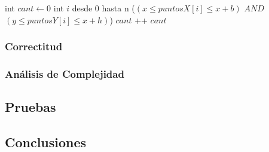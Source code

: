 \begin{algorithm}[H]
\caption{} 
\begin{codebox}
\li int $cant \gets 0$
\li \For int $i$ desde 0 hasta n \Do
\li 	\If ($(x \leq puntosX[i] \leq x+b)$  $AND$  $(y \leq puntosY[i] \leq x+h)$) \Do
\li 		$cant$ ++		
 		\End
 	\End	
\li \Return $cant $
\End
\end{codebox}
\end{algorithm}

\subsubsection{Correctitud}

\subsubsection{Análisis de Complejidad}

\subsection{Pruebas}

\subsection{Conclusiones}


